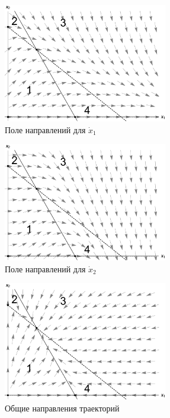 \documentclass[12pt,a4paper]{article}
\begin{document}
    \begin{figure}[h]
        \centering
        \includegraphics[width=0.64\textwidth]{dirFields_11.pdf}
        \caption{Поле направлений для $ \dot x_1 $}
        \label{fig:dirFields_11}
    \end{figure}

    \begin{figure}[h]
        \centering
        \includegraphics[width=0.64\textwidth]{dirFields_12.pdf}
        \caption{Поле направлений для $ \dot x_2 $}
        \label{fig:dirFields_12}
    \end{figure}

    \pagebreak
    
    \begin{figure}[h]
        \centering
        \includegraphics[width=0.64\textwidth]{areas_1.pdf}
        \caption{Общие направления траекторий}
        \label{fig:areas_1}
    \end{figure}
\end{document}

